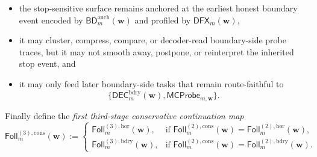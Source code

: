 \begin{definition}
\begin{enumerate}[label=(\roman*)]
 \begin{itemize}[leftmargin=2em]
 \item the stop-sensitive surface remains anchored at the earliest honest boundary event encoded by \(\mathsf{BD}^{\mathrm{anch}}_{m}(\mathbf w)\) and profiled by \(\mathsf{DFX}_{m}(\mathbf w)\),
 \item it may cluster, compress, compare, or decoder-read boundary-side probe traces, but it may not smooth away, postpone, or reinterpret the inherited stop event, and
 \item it may only feed later boundary-side tasks that remain route-faithful to
 \[
 \{\mathsf{DEC}^{\mathrm{bdry}}_{m}(\mathbf w),\mathsf{MCProbe}_{m,\mathbf w}\}.
 \]
 \end{itemize}
\end{enumerate}
Finally define the \emph{first third-stage conservative continuation map}
\[
 \mathsf{Foll}^{(3),\mathrm{cons}}_{m}(\mathbf w)
 :=
 \begin{cases}
 \mathsf{Foll}^{(3),\mathrm{hor}}_{m}(\mathbf w), & \text{if }\mathsf{Foll}^{(2),\mathrm{cons}}_{m}(\mathbf w)=\mathsf{Foll}^{(2),\mathrm{hor}}_{m}(\mathbf w),\\[2mm]
 \mathsf{Foll}^{(3),\mathrm{bdry}}_{m}(\mathbf w), & \text{if }\mathsf{Foll}^{(2),\mathrm{cons}}_{m}(\mathbf w)=\mathsf{Foll}^{(2),\mathrm{bdry}}_{m}(\mathbf w).
 \end{cases}
\]
\end{definition}

